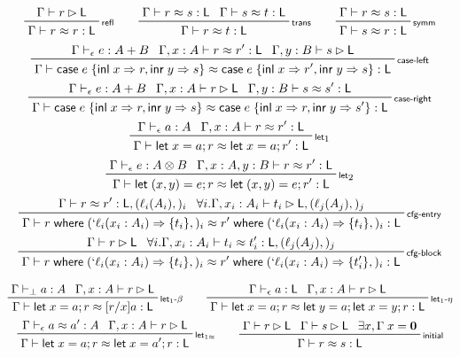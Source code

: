 \documentclass[acmsmall,screen,review]{acmart}
\newcommand{\mb}[1]{\ensuremath{\mathbf{#1}}}
\newcommand{\ms}[1]{\ensuremath{\mathsf{#1}}}
\newcommand{\lbl}[1]{{`#1}}
\newcommand{\lto}{\Rightarrow}
\newcommand{\linl}[1]{\ms{inl}\;{#1}}
\newcommand{\linr}[1]{\ms{inr}\;{#1}}
\newcommand{\caseexpr}[5]{\ms{case}\;#1\;\{\linl{#2} \lto #3, \linr{#4} \lto #5\}}
\newcommand{\letstmt}[3]{\ensuremath{\ms{let}\;#1 = #2; #3}}
\newcommand{\where}[2]{#1\;\ms{where}\;#2}
\newcommand{\wbranch}[3]{#1(#2) \lto \{#3\}}
\newcommand{\lwbranch}[3]{\wbranch{\lbl{#1}}{#2}{#3}}
\newcommand{\bhyp}[2]{#1 : #2}
\newcommand{\lhyp}[2]{#1(#2)}
\newcommand{\rle}[1]{{\scriptsize\textsf{#1}}}
\newcommand{\hasty}[4]{#1 \vdash_{#2} #3: {#4}}
\newcommand{\haslb}[3]{#1 \vdash #2 \rhd #3}
\newcommand{\teqv}{\approx}
\newcommand{\tmeq}[5]{#1 \vdash_{#2} #3 \teqv #4 : {#5}}
\newcommand{\lbeq}[4]{#1 \vdash #2 \teqv #3 : {#4}}
\begin{document}
\begin{gather*}
  \prftree[r]{\rle{refl}}{\haslb{\Gamma}{r}{\ms{L}}}{\lbeq{\Gamma}{r}{r}{\ms{L}}} \qquad
  \prftree[r]{\rle{trans}}{\lbeq{\Gamma}{r}{s}{\ms{L}}}{\lbeq{\Gamma}{s}{t}{\ms{L}}}
    {\lbeq{\Gamma}{r}{t}{\ms{L}}} \qquad
  \prftree[r]{\rle{symm}}{\lbeq{\Gamma}{r}{s}{\ms{L}}}{\lbeq{\Gamma}{s}{r}{\ms{L}}}
  \\
  \prftree[r]{\rle{case-left}}
    {\hasty{\Gamma}{\epsilon}{e}{A + B}}
    {\lbeq{\Gamma, \bhyp{x}{A}}{r}{r'}{\ms{L}}}
    {\haslb{\Gamma, \bhyp{y}{B}}{s}{\ms{L}}}
    {\lbeq{\Gamma}{\caseexpr{e}{x}{r}{y}{s}}{\caseexpr{e}{x}{r'}{y}{s}}{\ms{L}}}
  \\
  \prftree[r]{\rle{case-right}}
    {\hasty{\Gamma}{\epsilon}{e}{A + B}}
    {\haslb{\Gamma, \bhyp{x}{A}}{r}{\ms{L}}}
    {\lbeq{\Gamma, \bhyp{y}{B}}{s}{s'}{\ms{L}}}
    {\lbeq{\Gamma}{\caseexpr{e}{x}{r}{y}{s}}{\caseexpr{e}{x}{r}{y}{s'}}{\ms{L}}}
  \\
  \prftree[r]{\rle{let}$_1$}
    {\hasty{\Gamma}{\epsilon}{a}{A}}
    {\lbeq{\Gamma, \bhyp{x}{A}}{r}{r'}{\ms{L}}}
    {\lbeq{\Gamma}{\letstmt{x}{a}{r}}{\letstmt{x}{a}{r'}}{\ms{L}}}
  \\
  \prftree[r]{\rle{let}$_2$}
    {\hasty{\Gamma}{\epsilon}{e}{A \otimes B}}
    {\lbeq{\Gamma, \bhyp{x}{A}, \bhyp{y}{B}}{r}{r'}{\ms{L}}}
    {\lbeq{\Gamma}{\letstmt{(x, y)}{e}{r}}{\letstmt{(x, y)}{e}{r'}}{\ms{L}}}
  \\
  \prftree[r]{\rle{cfg-entry}}
    {\lbeq{\Gamma}{r}{r'}{\ms{L}, (\lhyp{\ell_i}{A_i},)_i}}
    {\forall i. \haslb{\Gamma, \bhyp{x_i}{A_i}}{t_i}{\ms{L}, (\lhyp{\ell_j}{A_j},)_j}}
    {\lbeq{\Gamma}
      {\where{r}{(\lwbranch{\ell_i}{x_i: A_i}{t_i},)_i}}
      {\where{r'}{(\lwbranch{\ell_i}{x_i: A_i}{t_i},)_i}}
      {\ms{L}}
    }
  \\
  \prftree[r]{\rle{cfg-block}}
    {\haslb{\Gamma}{r}{\ms{L}}}
    {\forall i. \lbeq{\Gamma, \bhyp{x_i}{A_i}}{t_i}{t_i'}{\ms{L}, (\lhyp{\ell_j}{A_j},)_j}}
    {\lbeq{\Gamma}
      {\where{r}{(\lwbranch{\ell_i}{x_i: A_i}{t_i},)_i}}
      {\where{r'}{(\lwbranch{\ell_i}{x_i: A_i}{t_i'},)_i}}
      {\ms{L}}
    }
\end{gather*}

\begin{gather*}
  \prftree[r]{\rle{let$_1$-$\beta$}}
    {\hasty{\Gamma}{\bot}{a}{A}}
    {\haslb{\Gamma, \bhyp{x}{A}}{r}{\ms{L}}}
    {\lbeq{\Gamma}{\letstmt{x}{a}{r}}{[r/x]a}{\ms{L}}}
  \qquad
  \prftree[r]{\rle{let$_1$-$\eta$}}
    {\hasty{\Gamma}{\epsilon}{a}{\ms{L}}}
    {\haslb{\Gamma, \bhyp{x}{A}}{r}{\ms{L}}}
    {\lbeq{\Gamma}{\letstmt{x}{a}{r}}{\letstmt{y}{a}{\letstmt{x}{y}{r}}}{\ms{L}}}
  \\
  \prftree[r]{\rle{let$_{1\approx}$}}
    {\tmeq{\Gamma}{\epsilon}{a}{a'}{A}}
    {\haslb{\Gamma, \bhyp{x}{A}}{r}{\ms{L}}}
    {\lbeq{\Gamma}{\letstmt{x}{a}{r}}{\letstmt{x}{a'}{r}}{\ms{L}}}
  \qquad
  \prftree[r]{\rle{initial}}
    {\haslb{\Gamma}{r}{\ms{L}}}
    {\haslb{\Gamma}{s}{\ms{L}}}
    {\exists x, \Gamma\;x = \mb{0}}
    {\lbeq{\Gamma}{r}{s}{\ms{L}}}
\end{gather*}
\end{document}
